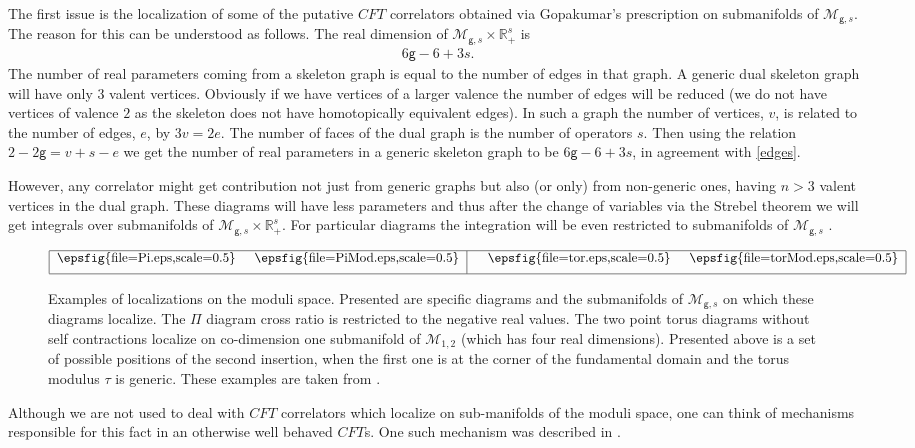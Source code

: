 \documentclass[11pt]{JHEP3}
\def\be{\begin{eqnarray}}
\def\ee{\end{eqnarray}}
\def\gg{\mathsf g }
\begin{document}
The first issue is the localization of some of the putative $CFT$ correlators obtained via
Gopakumar's prescription on submanifolds of ${\mathcal M}_{\gg,s}$. The reason for this can be
understood as follows. The real dimension of ${\mathcal M}_{\gg,s}\times {\mathbb R}^s_+$ is 
\be\label{edges} 6\gg-6+3s .\ee The number of real parameters coming from a skeleton graph is equal to the number of edges in that graph. A generic dual skeleton graph will
have only $3$ valent vertices. Obviously if we have vertices of a larger valence the number
of edges will be reduced (we do not have vertices of valence $2$ as the skeleton does 
not have homotopically equivalent edges). In such a graph the number of vertices, $v$, is related to the number of edges, $e$, by $3v=2e$. The number of faces of the dual graph is the number
of operators $s$. Then using the relation $2-2\gg=v+s-e$ we get the number of real parameters 
in a generic skeleton graph to be $6\gg-6+3s$, in agreement with \eqref{edges}.

 However,
any correlator might get contribution not just from generic graphs but also (or only)
from non-generic ones, having $n>3$ valent vertices in the dual graph. These diagrams
will have less parameters and thus after the change of variables via the Strebel theorem we will get integrals over submanifolds of ${\mathcal M}_{\gg,s}\times {\mathbb R}^s_+$. For particular diagrams 
the integration will be even restricted  to submanifolds of ${\mathcal M}_{\gg,s}$ 
\cite{Aharony:2006th,David:2006qc,Aharony:2007fs}.
\begin{figure}[htbp]
 \begin{center}
$\begin{tabular}{|c@{\hspace{0.2in}}c|c@{\hspace{0.2in}}c|}
\hline
\epsfig{file=Pi.eps,scale=0.5} & \epsfig{file=PiMod.eps,scale=0.5}\quad &\quad
\epsfig{file=tor.eps,scale=0.5} & \epsfig{file=torMod.eps,scale=0.5}
\\ [0.2cm]\hline \end{tabular}$
\caption{Examples of localizations on the moduli space. Presented are specific diagrams and
the submanifolds of ${\mathcal M}_{\gg,s}$  on which these diagrams localize. The $\Pi$ 
diagram cross ratio is restricted to the negative real values. The two point torus diagrams
without self contractions localize on co-dimension one submanifold of ${\mathcal M}_{1,2}$ (which has four real dimensions). Presented above is a set of possible positions of the second insertion, when the first one
is at the corner of the fundamental domain and the torus modulus $\tau$ is generic. These 
examples are taken from \cite{Aharony:2006th}.   } \label{locals}
\end{center}
\end{figure}
 Although we are not used to deal with $CFT$ correlators which
localize on sub-manifolds of the moduli space, one can think of mechanisms responsible
for this fact in an otherwise well behaved $CFT$s. One such mechanism was described in 
\cite{Aharony:2007fs}.
 
\end{document}
